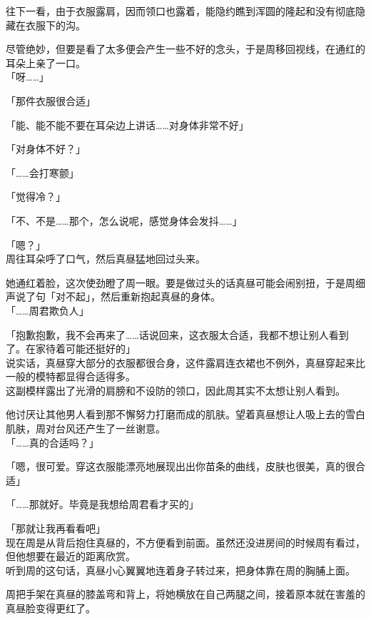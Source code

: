 往下一看，由于衣服露肩，因而领口也露着，能隐约瞧到浑圆的隆起和没有彻底隐藏在衣服下的沟。

尽管绝妙，但要是看了太多便会产生一些不好的念头，于是周移回视线，在通红的耳朵上亲了一口。\\

「呀……」

「那件衣服很合适」

「能、能不能不要在耳朵边上讲话……对身体非常不好」

「对身体不好？」

「……会打寒颤」

「觉得冷？」

「不、不是……那个，怎么说呢，感觉身体会发抖……」

「嗯？」\\

周往耳朵呼了口气，然后真昼猛地回过头来。

她通红着脸，这次使劲瞪了周一眼。要是做过头的话真昼可能会闹别扭，于是周细声说了句「对不起」，然后重新抱起真昼的身体。\\

「……周君欺负人」

「抱歉抱歉，我不会再来了……话说回来，这衣服太合适，我都不想让别人看到了。在家待着可能还挺好的」\\

说实话，真昼穿大部分的衣服都很合身，这件露肩连衣裙也不例外，真昼穿起来比一般的模特都显得合适得多。\\

这副模样露出了光滑的肩膀和不设防的领口，因此周其实不太想让别人看到。

他讨厌让其他男人看到那不懈努力打磨而成的肌肤。望着真昼想让人吸上去的雪白肌肤，周对台风还产生了一丝谢意。\\

「……真的合适吗？」

「嗯，很可爱。穿这衣服能漂亮地展现出出你苗条的曲线，皮肤也很美，真的很合适」

「……那就好。毕竟是我想给周君看才买的」

「那就让我再看看吧」\\

现在周是从背后抱住真昼的，不方便看到前面。虽然还没进房间的时候周有看过，但他想要在最近的距离欣赏。\\

听到周的这句话，真昼小心翼翼地连着身子转过来，把身体靠在周的胸脯上面。

周把手架在真昼的膝盖弯和背上，将她横放在自己两腿之间，接着原本就在害羞的真昼脸变得更红了。\\

